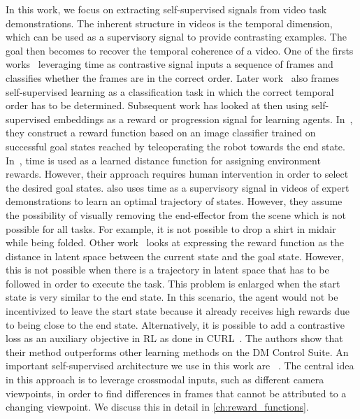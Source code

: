 \documentclass[\home/main.tex]{subfiles}
\begin{document}
In this work, we focus on extracting self-supervised signals from video task demonstrations. The inherent structure in videos is the temporal dimension, which can be used as a supervisory signal to provide contrasting examples. The goal then becomes to recover the temporal coherence of a video. One of the firsts works~\cite{Misra2016} leveraging time as contrastive signal inputs a sequence of frames and classifies whether the frames are in the correct order. Later work~\cite{Lee2017,Fernando2017} also frames self-supervised learning as a classification task in which the correct temporal order has to be determined. Subsequent work has looked at then using self-supervised embeddings as a reward or progression signal for learning agents. 
In~\cite{Singh2019}, they construct a reward function based on an image classifier trained on successful goal states reached by teleoperating the robot towards the end state. In~\cite{Hartikainen2019}, time is used as a learned distance function for assigning environment rewards. However, their approach requires human intervention in order to select the desired goal states. \cite{Nair2018time} also uses time as a supervisory signal in videos of expert demonstrations to learn an optimal trajectory of states. However, they assume the possibility of visually removing the end-effector from the scene which is not possible for all tasks. For example, it is not possible to drop a shirt in midair while being folded. Other work~\cite{Nair2018visual} looks at expressing the reward function as the distance in latent space between the current state and the goal state. However, this is not possible when there is a trajectory in latent space that has to be followed in order to execute the task. This problem is enlarged when the start state is very similar to the end state. In this scenario, the agent would not be incentivized to leave the start state because it already receives high rewards due to being close to the end state. %
Alternatively, it is possible to add a contrastive loss as an auxiliary objective in RL as done in CURL~\cite{Srinivas2020CURL}. The authors show that their method outperforms other learning methods on the DM Control Suite.
An important self-supervised architecture we use in this work are ~\autocite{Sermanet2017TCN}. The central idea in this approach is to leverage crossmodal inputs, such as different camera viewpoints, in order to find differences in frames that cannot be attributed to a changing viewpoint. We discuss this in detail in \cref{ch:reward_functions}.
\end{document}
